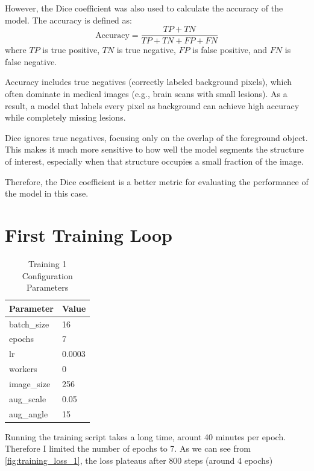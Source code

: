 \documentclass[11pt,a4paper]{article}
\begin{document}
However, the Dice coefficient was also used to calculate the accuracy of the model. The accuracy is defined as:
\begin{equation}
    \text{Accuracy} = \frac{TP + TN}{TP + TN + FP + FN}
\end{equation}
where \(TP\) is true positive, \(TN\) is true negative, \(FP\) is false positive, and \(FN\) is false negative.

Accuracy includes true negatives (correctly labeled background pixels), which often dominate in medical images (e.g., brain scans with small lesions). As a result, a model that labels every pixel as background can achieve high accuracy while completely missing lesions.

Dice ignores true negatives, focusing only on the overlap of the foreground object. This makes it much more sensitive to how well the model segments the structure of interest, especially when that structure occupies a small fraction of the image.

Therefore, the Dice coefficient is a better metric for evaluating the performance of the model in this case.

\section{First Training Loop}
\begin{table}[H]
    \centering
    \begin{tabular}{ll}
    \toprule
    \textbf{Parameter} & \textbf{Value} \\
    \midrule
    batch\_size   & 16 \\
    epochs        & 7 \\
    lr            & 0.0003 \\
    workers       & 0 \\
    image\_size   & 256 \\
    aug\_scale    & 0.05 \\
    aug\_angle    & 15 \\
    \bottomrule
    \end{tabular}
    \caption{Training 1 Configuration Parameters}
    \label{tab:args}
\end{table}
    
Running the training script takes a long time, arount 40 minutes per epoch. Therefore I limited the number of epochs to 7. As we can see from \autoref{fig:training_loss_1}, the loss plateaus after 800 steps (around 4 epochs)
\end{document}
